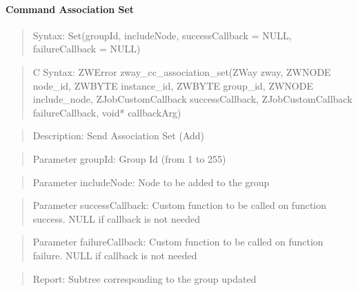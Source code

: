 \paragraph{Command Association Set}
\begin{quote}Syntax: Set(groupId, includeNode, successCallback = NULL, failureCallback = NULL)\end{quote}
\begin{quote}C Syntax: ZWError zway\_cc\_association\_set(ZWay zway, ZWNODE node\_id, ZWBYTE instance\_id, ZWBYTE group\_id, ZWNODE include\_node, ZJobCustomCallback successCallback, ZJobCustomCallback failureCallback, void* callbackArg)\end{quote}
\begin{quote}Description: Send Association Set (Add)\end{quote}
\begin{quote}Parameter groupId: Group Id (from 1 to 255)\end{quote}
\begin{quote}Parameter includeNode: Node to be added to the group\end{quote}
\begin{quote}Parameter successCallback: Custom function to be called on function success. NULL if callback is not needed\end{quote}
\begin{quote}Parameter failureCallback: Custom function to be called on function failure. NULL if callback is not needed\end{quote}
\begin{quote}Report: Subtree corresponding to the group updated\end{quote}

